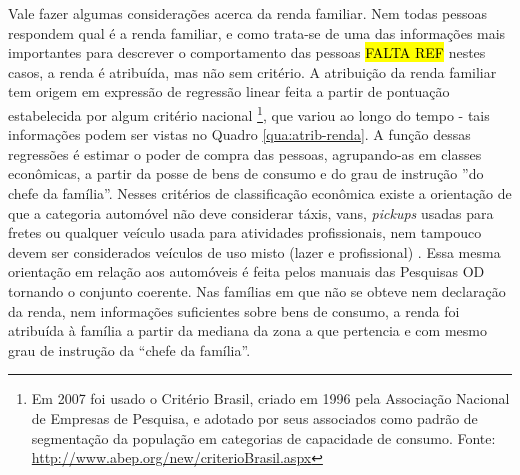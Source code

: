 Vale fazer algumas considerações acerca da renda familiar. Nem todas pessoas respondem qual é a renda familiar, e como trata-se de uma das informações mais importantes para descrever o comportamento das pessoas \hl{FALTA REF} nestes casos, a renda é atribuída, mas não sem critério. A atribuição da renda familiar tem origem em expressão de regressão linear feita a partir de pontuação estabelecida por algum critério nacional
\footnote{Em 2007 foi usado o Critério Brasil, criado em 1996 pela Associação Nacional de Empresas de Pesquisa, e adotado por seus associados como padrão de segmentação da população em categorias de capacidade de consumo. Fonte: \url{http://www.abep.org/new/criterioBrasil.aspx}}, que variou ao longo do tempo - tais informações podem ser vistas no Quadro \ref{qua:atrib-renda}. 
A função dessas regressões é estimar o poder de compra das pessoas, agrupando-as em classes econômicas, a partir da posse de bens de consumo e do grau de instrução ''do chefe da família''. Nesses critérios de classificação econômica existe a orientação de que a categoria automóvel não deve considerar táxis, vans, \emph{pickups} usadas para fretes ou qualquer veículo usada para atividades profissionais, nem tampouco devem ser considerados veículos de uso misto (lazer e profissional) \cite{CRITERIOBRASIL}. Essa mesma orientação em relação aos automóveis é feita pelos manuais das Pesquisas OD \cite{OD77, OD87, OD97, OD07} tornando o conjunto coerente.
Nas famílias em que não se obteve nem declaração da renda, nem informações suficientes sobre bens de consumo, a renda foi atribuída à família a partir da mediana da zona a que pertencia e com mesmo grau de instrução da ``chefe da família''.

